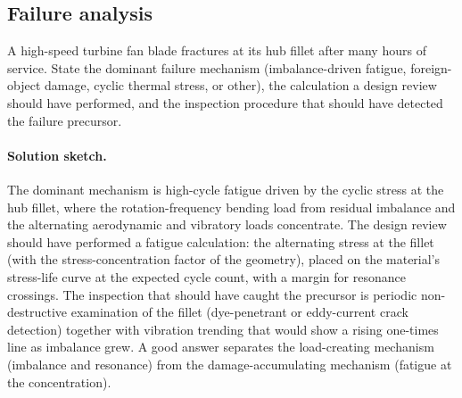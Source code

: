 \subsection*{Failure analysis}

\begin{exercise}
A high-speed turbine fan blade fractures at its hub fillet after
many hours of service. State the dominant failure mechanism
(imbalance-driven fatigue, foreign-object damage, cyclic thermal
stress, or other), the calculation a design review should have
performed, and the inspection procedure that should have detected
the failure precursor.
\paragraph{Solution sketch.} The dominant mechanism is high-cycle
fatigue driven by the cyclic stress at the hub fillet, where the
rotation-frequency bending load from residual imbalance and the
alternating aerodynamic and vibratory loads concentrate. The design
review should have performed a fatigue calculation: the alternating
stress at the fillet (with the stress-concentration factor of the
geometry), placed on the material's stress-life curve at the expected
cycle count, with a margin for resonance crossings. The inspection
that should have caught the precursor is periodic non-destructive
examination of the fillet (dye-penetrant or eddy-current crack
detection) together with vibration trending that would show a rising
one-times line as imbalance grew. A good answer separates the
load-creating mechanism (imbalance and resonance) from the
damage-accumulating mechanism (fatigue at the concentration).
\end{exercise}

